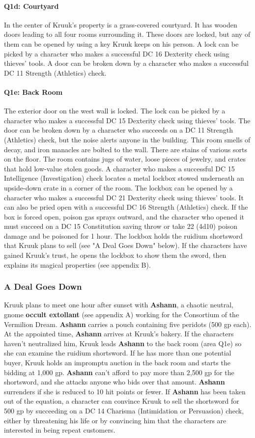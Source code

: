 \documentclass[10pt,a4,twoside,twocolumn,openany,nodeprecatedcode]{dndbook}
\begin{document}
\paragraph{Q1d: Courtyard}
In the center of Kruuk's property is a grass-covered courtyard. It has wooden doors leading to all four rooms surrounding it. These doors are locked, but any of them can be opened by using a key Kruuk keeps on his person. A lock can be picked by a character who makes a successful DC 16 Dexterity check using thieves' tools. A door can be broken down by a character who makes a successful DC 11 Strength (Athletics) check.
\paragraph{Q1e: Back Room}
The exterior door on the west wall is locked. The lock can be picked by a character who makes a successful DC 15 Dexterity check using thieves' tools. The door can be broken down by a character who succeeds on a DC 11 Strength (Athletics) check, but the noise alerts anyone in the building.
This room smells of decay, and iron manacles are bolted to the wall. There are stains of various sorts on the floor. The room contains jugs of water, loose pieces of jewelry, and crates that hold low-value stolen goods.
A character who makes a successful DC 15 Intelligence (Investigation) check locates a metal lockbox stowed underneath an upside-down crate in a corner of the room. The lockbox can be opened by a character who makes a successful DC 21 Dexterity check using thieves' tools. It can also be pried open with a successful DC 16 Strength (Athletics) check. If the box is forced open, poison gas sprays outward, and the character who opened it must succeed on a DC 15 Constitution saving throw or take 22 (4d10) poison damage and be poisoned for 1 hour.
The lockbox holds the ruidium shortsword that Kruuk plans to sell (see "A Deal Goes Down" below). If the characters have gained Kruuk's trust, he opens the lockbox to show them the sword, then explains its magical properties (see appendix B).
\subsubsection{A Deal Goes Down}
Kruuk plans to meet one hour after sunset with \textbf{Ashann}, a chaotic neutral, gnome \textbf{occult extollant} (see appendix A) working for the Consortium of the Vermilion Dream. \textbf{Ashann} carries a pouch containing five peridots (500 gp each).
At the appointed time, \textbf{Ashann} arrives at Kruuk's bakery. If the characters haven't neutralized him, Kruuk leads \textbf{Ashann} to the back room (area Q1e) so she can examine the ruidium shortsword. If he has more than one potential buyer, Kruuk holds an impromptu auction in the back room and starts the bidding at 1,000 gp. \textbf{Ashann} can't afford to pay more than 2,500 gp for the shortsword, and she attacks anyone who bids over that amount. \textbf{Ashann} surrenders if she is reduced to 10 hit points or fewer.
If \textbf{Ashann} has been taken out of the equation, a character can convince Kruuk to sell the shortsword for 500 gp by succeeding on a DC 14 Charisma (Intimidation or Persuasion) check, either by threatening his life or by convincing him that the characters are interested in being repeat customers.
\end{document}
